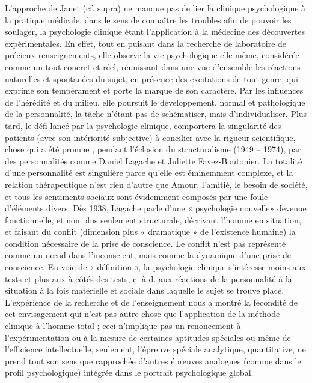 L’approche de Janet (cf. supra) ne manque pas de lier la clinique psychologique à la pratique médicale, dans le sens de connaître les troubles afin de pouvoir les soulager, la psychologie clinique étant l’application à la médecine des découvertes expérimentales.
En effet, tout en puisant dans la recherche de laboratoire de précieux renseignements, elle observe la vie psychologique elle-même, considérée comme un tout concret et réel, réunissant dans une vue d’ensemble les réactions naturelles et spontanées du sujet, en présence des excitations de tout genre, qui exprime son tempérament et porte la marque de son caractère. Par les influences de l’hérédité et du milieu, elle poursuit le développement, normal et pathologique de la personnalité, la tâche n’étant pas de schématiser, mais d’individualiser.
Plus tard, le défi lancé par la psychologie clinique, comportera la singularité des patients (avec son intériorité subjective) à concilier avec la rigueur scientifique, chose qui a été promue , pendant l’éclosion du structuralisme (1949 – 1974), par des personnalités comme Daniel Lagache et Juliette Favez-Boutonier.
La totalité d’une personnalité est singulière parce qu’elle est éminemment complexe, et la relation thérapeutique n’est rien d’autre que Amour, l’amitié, le besoin de société, et tous les sentiments sociaux sont évidemment composés par une foule d’éléments divers.
Dès 1938, Lagache parle d’une « psychologie nouvelle» devenue fonctionnelle, et non plus seulement structurale, décrivant l’homme en situation, et faisant du conflit (dimension plus « dramatique » de l’existence humaine) la condition nécessaire de la prise de conscience.
Le conflit n’est pas représenté comme un nœud dans l’inconscient, mais comme la dynamique d’une prise de conscience.
En voie de « définition », la psychologie clinique s’intéresse moins
aux tests et plus aux à-côtés des tests, c. à d. aux réactions de la
personnalité à la situation à la fois matérielle et sociale dans
laquelle le sujet se trouve placé. L’expérience de la recherche et de
l’enseignement nous a montré la fécondité de cet envisagement qui
n’est pas autre chose que l’application de la méthode clinique à
l’homme total ; ceci n’implique pas un renoncement à l’expérimentation
ou à la mesure de certaines aptitudes spéciales ou même de
l’efficience intellectuelle, seulement, l’épreuve spéciale analytique, quantitative, ne prend tout son sens que rapprochée d’autres épreuves analogues (comme dans le profil psychologique) intégrée dans le portrait psychologique global.
